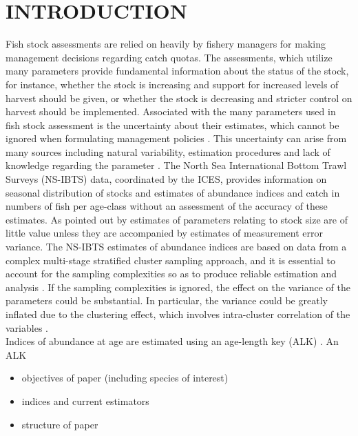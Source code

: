 \documentclass[a4paper 12pt]{article}
\numberwithin{equation}{section}
\begin{document}
\clearpage
\section{\large INTRODUCTION}
Fish stock assessments are relied on heavily by fishery managers for making management decisions regarding catch quotas. The assessments, which utilize many parameters provide fundamental information about the status of the stock, for instance, whether the stock is increasing and support for increased levels of harvest should be given, or whether the stock is decreasing and stricter control on harvest should be implemented. Associated with the many parameters used in fish stock assessment is the uncertainty about their estimates, which cannot be ignored when formulating management policies \citep{walters1981effects, ludwig1981measurement}. This uncertainty can arise from many sources including natural variability, estimation procedures and lack of knowledge regarding the parameter \citep{ehrhardt1997role}. The North Sea International Bottom Trawl Surveys (NS-IBTS) data, coordinated by the ICES, provides information on seasonal distribution of stocks and estimates of abundance indices and catch in numbers of fish per age-class without an assessment of the accuracy of these estimates.  As pointed out by  \citet{ludwig1981measurement} estimates of parameters relating to stock size are of little value unless they are accompanied by estimates of measurement error variance. The NS-IBTS estimates of abundance indices are based on data from a complex multi-stage stratified cluster sampling approach,  and  it is essential to account for the sampling complexities so as to produce reliable estimation and analysis \citep{lehtonen2004practical}. If the sampling complexities is ignored, the effect on the variance  of the parameters could be substantial. In particular, the variance could be greatly inflated  due to the clustering effect, which involves intra-cluster correlation of the variables \citep{aanes2015efficient, lehtonen2004practical}. \\
\indent Indices of abundance at age are estimated using an age-length key (ALK) \citep{fridriksson1934calculation}. An ALK  

 \begin{itemize}
 \item objectives of paper (including species of interest)
 \item indices and current estimators
 \item structure of paper
 \end{itemize}
\end{document}
